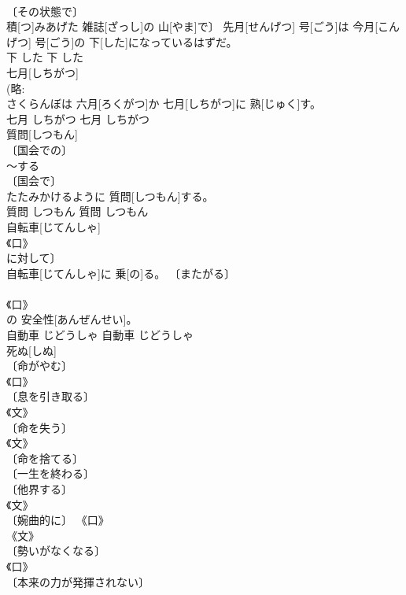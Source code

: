 \documentclass[8pt]{extreport}
\begin{document}
\begin{CJK}{UTF8}{min}
\\	〔その状態で〕	
\\	積[つ]みあげた 雑誌[ざっし]の 山[やま]で〕 先月[せんげつ] 号[ごう]は 今月[こんげつ] 号[ごう]の 下[した]になっているはずだ。	
\\	下	した	下	した	
\\	七月[しちがつ]	
\\	(略: 
\\	さくらんぼは 六月[ろくがつ]か 七月[しちがつ]に 熟[じゅく]す。	
\\	七月	しちがつ	七月	しちがつ	
\\	質問[しつもん]	
\\	〔国会での〕 
\\	～する 
\\	〔国会で〕 
\\	たたみかけるように 質問[しつもん]する。	
\\	質問	しつもん	質問	しつもん	
\\	自転車[じてんしゃ]	
\\	《口》 
\\	に対して〕 
\\	自転車[じてんしゃ]に 乗[の]る。	〔またがる〕 
\\	[《文》 
\\	〔乗って走る〕 
\\	自転車	じてんしゃ	自転車	じてんしゃ	
\\	自動車[じどうしゃ]	
\\	《口》 
\\	[⇒くるま 
\\	自動車[じどうしゃ]の 安全性[あんぜんせい]。	
\\	自動車	じどうしゃ	自動車	じどうしゃ	
\\	死ぬ[しぬ]	
\\	〔命がやむ〕 
\\	《口》 
\\	〔息を引き取る〕 
\\	《文》 
\\	〔命を失う〕 
\\	《文》 
\\	〔命を捨てる〕 
\\	〔一生を終わる〕 
\\	〔他界する〕 
\\	《文》 
\\	〔婉曲的に〕 《口》 
\\	《文》 
\\	〔勢いがなくなる〕 
\\	《口》 
\\	〔本来の力が発揮されない〕 

\end{CJK}
\end{document}
